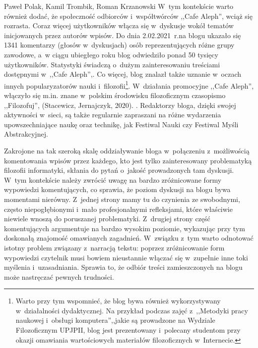 \begin{newrevplenv}{Paweł Polak, Kamil Trombik, Roman Krzanowski}
W~tym kontekście warto również dodać, że społeczność odbiorców i~współtwórców ,,Cafe Aleph'', wciąż się rozrasta. Coraz więcej użytkowników włącza się w~dyskusje wokół tematów inicjowanych przez autorów wpisów. Do dnia 2.02.2021~r.na blogu ukazało się 1341 komentarzy (głosów w~dyskusjach) osób reprezentujących różne grupy zawodowe, a~w ciągu ubiegłego roku blog odwiedziło ponad 50 tysięcy użytkowników. Statystyki świadczą o~dużym zainteresowaniu treściami dostępnymi w~,,Cafe Aleph'',. Co więcej, blog znalazł także uznanie w~oczach innych popularyzatorów nauki i~filozofii\footnote{Warto przy tym wspomnieć, że blog bywa również wykorzystywany w~działalności dydaktycznej. Na przykład podczas zajęć z~,,Metodyki pracy naukowej i~obsługi komputera'',,jakie są prowadzone na Wydziale Filozoficznym UPJPII, blog jest prezentowany i~polecany studentom przy okazji omawiania wartościowych materiałów filozoficznych w~Internecie.}. W~działania promocyjne ,,Cafe Aleph'', włączyło się m.in. znane w~polskim środowisku filozoficznym czasopismo ,,Filozofuj'',
(Stacewicz, Jernajczyk, 2020).
\parencite{stacewicz_filozofuj_2020}. %
Redaktorzy bloga, dzięki swojej aktywności w~sieci, są także regularnie zapraszani na różne wydarzenia upowszechniające naukę oraz technikę, jak Festiwal Nauki czy Festiwal Myśli Abstrakcyjnej.

Zakrojone na tak szeroką skalę oddziaływanie bloga w~połączeniu z~możliwością komentowania wpisów przez każdego, kto jest tylko zainteresowany problematyką filozofii informatyki, skłania do pytań o~jakość prowadzonych tam dyskusji. W~tym kontekście należy zwrócić uwagę na bardzo zróżnicowane formy wypowiedzi komentujących, co sprawia, że poziom dyskusji na blogu bywa momentami nierówny. Z~jednej strony mamy tu do czynienia ze swobodnymi, często niepogłębionymi i~mało profesjonalnymi refleksjami, które właściwie niewiele wnoszą do poruszanej problematyki. Z~drugiej strony część komentujących argumentuje na bardzo wysokim poziomie, wykazując przy tym doskonałą znajomość omawianych zagadnień. W~związku z~tym warto odnotować istotny problem związany z~narracją tekstu: poprzez zróżnicowanie form wypowiedzi czytelnik musi bowiem nieustannie włączać się w~zupełnie inne toki myślenia i~uzasadniania. Sprawia to, że odbiór treści zamieszczonych na blogu może nastręczać pewnych trudności.


\end{newrevplenv}
